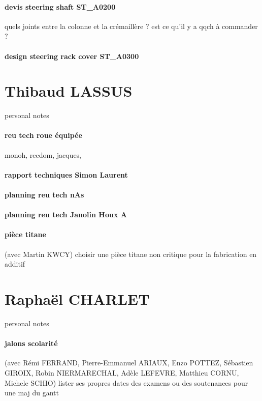 \paragraph{devis steering shaft ST\_A0200} quels joints entre la colonne et la crémaillère ? est ce qu'il y a qqch à commander ?
\paragraph{design steering rack cover ST\_A0300} 

 
 \newpage \section*{Thibaud LASSUS} 
 \par personal notes
\paragraph{reu tech roue équipée} monoh, reedom, jacques, 
\paragraph{rapport techniques Simon Laurent} 
\paragraph{planning reu tech nAs} 
\paragraph{planning reu tech Janolin Houx A} 
\paragraph{pièce titane} (avec Martin KWCY) choisir une pièce titane non critique pour la fabrication en additif

 
 \newpage \section*{Raphaël CHARLET} 
 \par personal notes
\paragraph{jalons scolarité} (avec Rémi FERRAND, Pierre-Emmanuel ARIAUX, Enzo POTTEZ, Sébastien GIROIX, Robin NIERMARECHAL, Adèle LEFEVRE, Matthieu CORNU, Michele SCHIO) lister ses propres dates des examens ou des soutenances pour une maj du gantt
